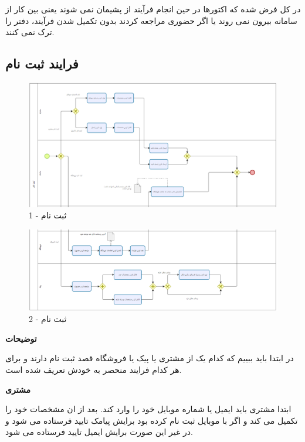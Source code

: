 \documentclass[12pt,a4paper]{article}
\begin{document}
در کل فرض شده که اکتورها در حین انجام فرآیند از پشیمان نمی شوند یعنی بین کار از سامانه بیرون نمی روند یا اگر حضوری مراجعه کردند بدون تکمیل شدن فرآیند، دفتر را ترک نمی کنند.
\pagebreak

\subsection{فرایند ثبت نام} \label{section.function.register}
	
	\begin{figure}[h!]
		\begin{center}
			\includegraphics[width=14cm]{images/Bizagi Register 1.png}	
		\end{center}
		\caption{ثبت نام - 1}
	\end{figure}
	\begin{figure}[h!]
		\begin{center}
			\includegraphics[width=14cm]{images/Bizagi Register 2.png}	
		\end{center}
		\caption{ثبت نام - 2}
	\end{figure}
	
	\textbf{توضیحات}
	
	
	در ابتدا باید ببییم که کدام یک از مشتری یا پیک یا فروشگاه قصد ثبت نام دارند و برای هر کدام فرایند منحصر به خودش تعریف شده است.
	
	\textbf{مشتری}
	
	ابتدا مشتری باید ایمیل یا شماره موبایل خود را وارد کند. بعد از ان مشخصات خود را تکمیل می کند و اگر با موبایل ثبت نام کرده بود برایش پیامک تایید فرستاده می شود و در غیر این صورت برایش ایمیل تایید فرستاده می شود.\\
	
\end{document}
